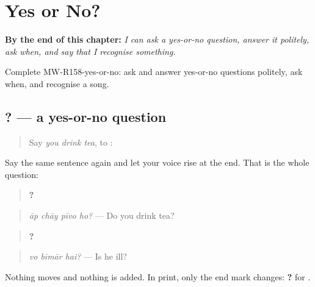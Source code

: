 
\chapter{Yes or No?}
\label{ch:mw-a2-yes-or-no}

\begin{chapteropening}
\textbf{By the end of this chapter:} \emph{I can ask a yes-or-no question, answer it politely, ask when, and say that I recognise something.}

Complete MW-R158-yes-or-no: ask and answer yes-or-no questions politely, ask when, and recognise a song.
\end{chapteropening}

\section[\texorpdfstring{\mw{आप} \mw{चाय} \mw{पीवो} \mw{हो}? (āp chāy pīvo ho?)}{आप चाय पीवो हो? (āp chāy pīvo ho?)}]{   ? — a yes-or-no question}

\label{lesson:MW-C158-polar}



\begin{quote}
Say \emph{you drink tea}, to \textbf{}: \textbf{   }
\end{quote}

\begin{grammarlens}[title={Grammar Lens: the voice does it}]
Say the same sentence again and let your voice rise at the end. That is the whole question:

\begin{quote}
\textbf{   ?}
\end{quote}

\begin{quote}
\emph{āp chāy pīvo ho?} — Do you drink tea?
\end{quote}

\begin{quote}
\textbf{  ?}
\end{quote}

\begin{quote}
\emph{vo bīmār hai?} — Is he ill?
\end{quote}

Nothing moves and nothing is added. In print, only the end mark changes: \textbf{?} for \textbf{}.
\end{grammarlens}

